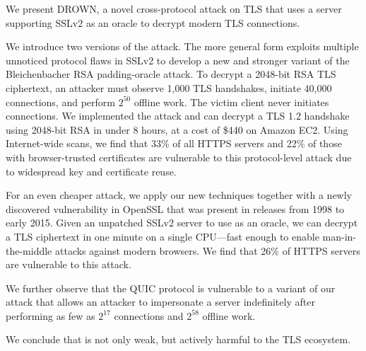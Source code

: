We present DROWN, a novel cross-protocol attack on TLS that uses a server
supporting SSLv2 as an oracle to decrypt modern TLS connections.

We introduce two versions of the attack. The more general form exploits
multiple unnoticed protocol flaws in SSLv2 to develop a new and stronger
variant of the Bleichenbacher RSA padding-oracle attack. To decrypt a
2048-bit RSA TLS ciphertext, an attacker must observe 1,000 TLS handshakes,
initiate 40,000 \ssltwo connections, and perform $2^{50}$ offline work. The
victim client never initiates \ssltwo connections. We implemented the attack
and can decrypt a TLS 1.2 handshake using 2048-bit RSA in under 8 hours, at a
cost of \$440 on Amazon EC2\@. Using Internet-wide scans, we find that 33\%
of all HTTPS servers and 22\% of those with browser-trusted certificates are
vulnerable to this protocol-level attack due to widespread key and
certificate reuse.

For an even cheaper attack, we apply our new techniques together with a newly
discovered vulnerability in OpenSSL that was present in releases from 1998 to
early 2015. Given an unpatched SSLv2 server to use as an oracle, we can
decrypt a TLS ciphertext in one minute on a single CPU---fast enough to
enable man-in-the-middle attacks against modern browsers. We find that 26\%
of HTTPS servers are vulnerable to this attack.

We further observe that the QUIC protocol is vulnerable to a variant of our
attack that allows an attacker to impersonate a server indefinitely after
performing as few as $2^{17}$ \ssltwo connections and $2^{58}$ offline work.

We conclude that \ssltwo is not only weak, but actively harmful to the TLS ecosystem.

